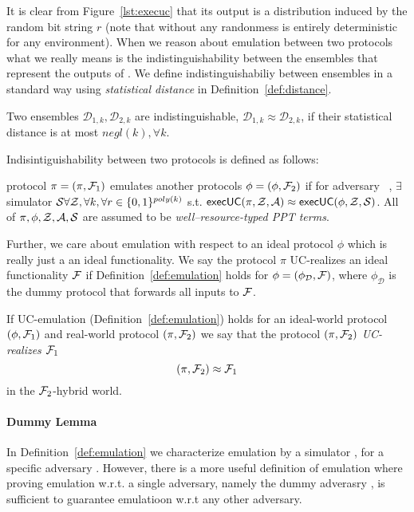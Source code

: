It is clear from Figure~\ref{lst:execuc} that its output is a distribution induced by the random bit string $r$ (note that without any randonmess  is entirely deterministic for any environment).
When we reason about emulation between two protocols what we really means is the indistinguishability between the ensembles that represent the outputs of .
We define indistinguishabiliy between ensembles in a standard way using \textit{statistical distance} in Definition~\ref{def:distance}.

\begin{definition}[Indisinguishability]\label{def:distance}
Two ensembles $\mathcal{D}_{1,k}, \mathcal{D}_{2,k}$ are indistinguishable, $\mathcal{D}_{1,k} \approx \mathcal{D}_{2,k}$, if their statistical distance is at most $negl(k), \forall k$.
\end{definition}

Indisintiguishability between two protocols is defined as follows:
\begin{definition}[Emulation]\label{def:emulation}
protocol $\pi = (\pi, \mathcal{F}_1)$ emulates another protocols $\phi = (\phi, \mathcal{F}_2)$ if for adversary \Adversary~, $\exists$ simulator $\mathcal{S} \forall \mathcal{Z}, \forall k, \forall r \in \{0,1\}^{poly(k)}$ s.t. ${\mathsf {execUC}}(\pi, \mathcal{Z}, \mathcal{A}) \approx {\mathsf {execUC}}(\phi, \mathcal{Z}, \mathcal{S})$. All of $\pi, \phi, \mathcal{Z}, \mathcal{A}, \mathcal{S}$ are assumed to be \textit{well--resource-typed PPT terms}.
\end{definition}


Further, we care about emulation with respect to an ideal protocol $\phi$ which is really just a an ideal functionality. 
We say the protocol $\pi$ UC-realizes an ideal functionality $\mathcal{F}$ if Definition~\ref{def:emulation} holds for $\phi = (\phi_{\mathcal{D}}, \mathcal{F})$, where $\phi_{\mathcal{D}}$ is the dummy protocol that forwards all inputs to $\mathcal{F}$.

\begin{definition}[UC-Realize]
If UC-emulation (Definition~\ref{def:emulation}) holds for an ideal-world protocol $(\phi, \mathcal{F}_1)$ and real-world protocol $(\pi, \mathcal{F}_2)$ we say that the protocol $(\pi, \mathcal{F}_2)$ \textit{UC-realizes} $\mathcal{F}_1$
$$ (\pi, \mathcal{F}_2) \approx \mathcal{F}_1 $$
in the $\mathcal{F}_2$-hybrid world.
\end{definition}

\paragraph{Dummy Lemma}
In Definition~\ref{def:emulation} we characterize emulation by a simulator \Simulator, for a specific adversary \Adversary.
However, there is a more useful definition of emulation where proving emulation w.r.t. a single adversary, namely the dummy adverasry \DummyAdv, is sufficient to guarantee emulatioon w.r.t any other adversary.

